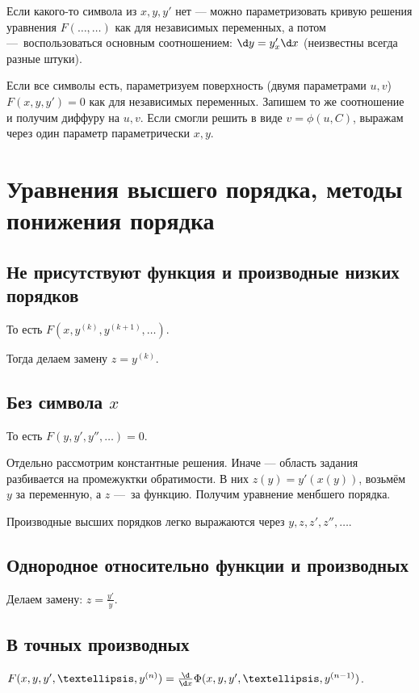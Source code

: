 \documentclass[12pt, a4paper]{article}
\begin{document}
Если какого-то символа из $x, y, y'$ нет 
— можно параметризовать кривую решения уравнения $F(…, …)$ как для независимых переменных, 
а потом — воспользоваться основным соотношением: $\d y = y'_x \d x$ (неизвестны всегда разные штуки).

Если все символы есть, параметризуем поверхность (двумя параметрами $u, v$) $F(x, y, y') = 0$ как для независимых переменных.
Запишем то же соотношение и получим диффуру на $u, v$. Если смогли решить в виде $v = \phi(u, C)$, выражам через один параметр параметрически $x, y$.

\section{Уравнения высшего порядка, методы понижения порядка}

\subsection{Не присутствуют функция и производные низких порядков}

То есть $F(x, y^{(k)}, y^{(k + 1)}, …)$.

Тогда делаем замену $z = y^{(k)}$.

\subsection{Без символа $x$}

То есть $F(y, y', y'', …) = 0$.

Отдельно рассмотрим константные решения. Иначе — область задания разбивается на промежуктки обратимости.
В них $z(y) = y'(x(y))$, возьмём $y$ за переменную, а $z$ — за функцию. Получим уравнение менбшего порядка.

Производные высших порядков легко выражаются через $y, z, z', z'', …$.


\subsection{Однородное относительно функции и производных}

Делаем замену: $z = \frac{y'}{y}$.

\subsection{В точных производных}

$F(x, y, y', …, y^{(n)}) = \frac{\d}{\d x} \Phi(x, y, y', …, y^{(n - 1)})$.
\end{document}
